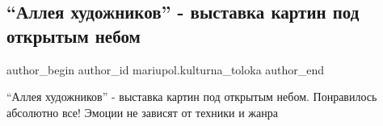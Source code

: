  
 
 
 
 

\subsection{\enquote{Аллея художников} - выставка картин под открытым небом}
\label{sec:27_07_2019.fb.mariupol.kulturna_toloka.1._alleya_khudozhnikov}

\ifcmt
 author_begin
   author_id mariupol.kulturna_toloka
 author_end
\fi

\enquote{Аллея художников} - выставка картин под открытым небом. Понравилось абсолютно все! Эмоции не зависят от техники и жанра
